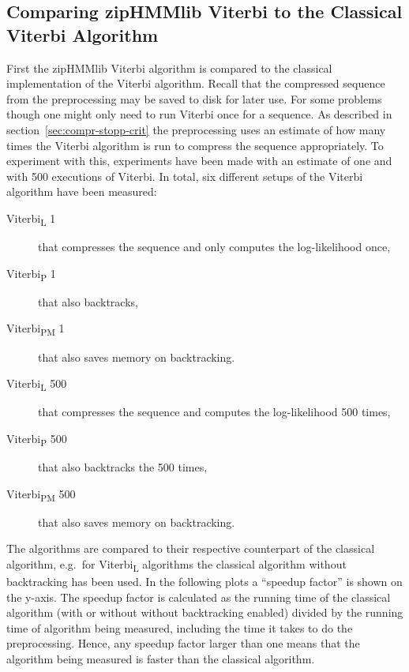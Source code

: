 \subsection{Comparing zipHMMlib Viterbi to the Classical Viterbi Algorithm}
\label{sec:comp-ziphmml-viterbi}

First the zipHMMlib Viterbi algorithm is compared to the classical
implementation of the Viterbi algorithm. Recall that the compressed sequence
from the preprocessing may be saved to disk for later use. For some problems
though one might only need to run Viterbi once for a sequence. As described in
section~\ref{sec:compr-stopp-crit} the preprocessing uses an estimate of how
many times the Viterbi algorithm is run to compress the sequence appropriately.
To experiment with this, experiments have been made with an estimate of one and
with 500 executions of Viterbi. In total, six different setups of the Viterbi
algorithm have been measured:
\begin{description}
\item[Viterbi\textsubscript{L} 1] that compresses the sequence and only computes the
  log-likelihood once,
\item[Viterbi\textsubscript{P} 1] that also backtracks,
\item[Viterbi\textsubscript{PM} 1] that also saves memory on backtracking.
\item[Viterbi\textsubscript{L} 500] that compresses the sequence and computes the
  log-likelihood 500 times,
\item[Viterbi\textsubscript{P} 500] that also backtracks the 500 times,
\item[Viterbi\textsubscript{PM} 500] that also saves memory on backtracking.
\end{description}

The algorithms are compared to their respective counterpart of the classical
algorithm, e.g.\ for Viterbi\textsubscript{L} algorithms the classical
algorithm without backtracking has been used. In the following plots a
``speedup factor'' is shown on the y-axis. The speedup factor is calculated as
the running time of the classical algorithm (with or without without backtracking
enabled) divided by the running time of algorithm being measured, including the
time it takes to do the preprocessing. Hence, any speedup factor larger than one
means that the algorithm being measured is faster than the classical algorithm.

